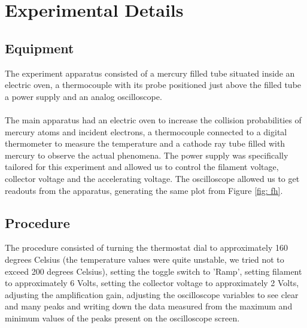 \section{Experimental Details}

	\subsection{Equipment}
		The experiment apparatus consisted of a mercury filled tube situated inside an electric oven, a thermocouple with its probe positioned just above the filled tube a power supply and an analog oscilloscope.
		\\
		\\
		The main apparatus had an electric oven to increase the collision probabilities of mercury atoms and incident electrons, a thermocouple connected to a digital thermometer to measure the temperature and a cathode ray tube filled with mercury to observe the actual phenomena. The power supply was specifically tailored for this experiment and allowed us to control the filament voltage, collector voltage and the accelerating voltage. The oscilloscope allowed us to get readouts from the apparatus, generating the same plot from Figure \ref{fig: fh}. 
	
	\subsection{Procedure}
	
		The procedure consisted of turning the thermostat dial to approximately 160 degrees Celsius (the temperature values were quite unstable, we tried not to exceed 200 degrees Celsius), setting the toggle switch to 'Ramp', setting filament to approximately 6 Volts, setting the collector voltage to approximately 2 Volts, adjusting the amplification gain, adjusting the oscilloscope variables to see clear and many peaks and writing down the data measured from the maximum and minimum values of the peaks present on the oscilloscope screen. 
